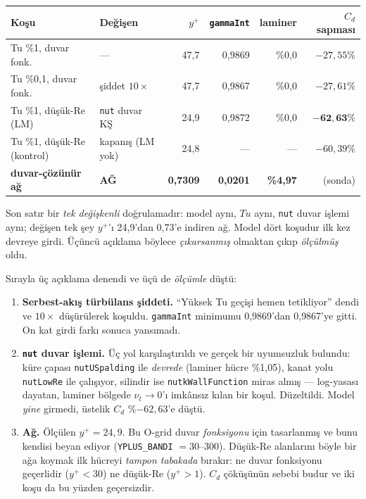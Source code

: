 \documentclass[11pt,a4paper]{article}
\begin{document}
\begin{center}\footnotesize
\begin{tabular}{@{}llrrrr@{}}
\toprule
Koşu & Değişen & $y^+$ & \texttt{gammaInt} & laminer & $C_d$ sapması \\
\midrule
Tu \%1, duvar fonk.        & ---                   & 47{,}7 & 0{,}9869 & \%0{,}0 & $-27{,}55\%$ \\
Tu \%0{,}1, duvar fonk.    & şiddet $10\times$     & 47{,}7 & 0{,}9867 & \%0{,}0 & $-27{,}61\%$ \\
Tu \%1, düşük-Re (LM)      & \texttt{nut} duvar KŞ & 24{,}9 & 0{,}9872 & \%0{,}0 & $\mathbf{-62{,}63\%}$ \\
Tu \%1, düşük-Re (kontrol) & kapanış (LM yok)      & 24{,}8 & ---      & ---     & $-60{,}39\%$ \\
\textbf{duvar-çözünür ağ}  & \textbf{AĞ}           & \textbf{0{,}7309} & \textbf{0{,}0201} & \textbf{\%4{,}97} & (sonda) \\
\bottomrule
\end{tabular}
\end{center}

\noindent Son satır bir \emph{tek değişkenli} doğrulamadır: model aynı,
$Tu$ aynı, \texttt{nut} duvar işlemi aynı; değişen tek şey $y^+$'ı 24{,}9'dan
0{,}73'e indiren ağ. Model dört koşudur ilk kez devreye girdi. Üçüncü açıklama
böylece \emph{çıkarsanmış} olmaktan çıkıp \emph{ölçülmüş} oldu.

\noindent Sırayla üç açıklama denendi ve üçü de \emph{ölçümle} düştü:

\begin{enumerate}\itemsep2pt
\item \textbf{Serbest-akış türbülans şiddeti.} ``Yüksek Tu geçişi hemen
tetikliyor'' dendi ve $10\times$ düşürülerek koşuldu. \texttt{gammaInt}
minimumu 0{,}9869'dan 0{,}9867'ye gitti. On kat girdi farkı sonuca
yansımadı.
\item \textbf{\texttt{nut} duvar işlemi.} Üç yol karşılaştırıldı ve gerçek
bir uyumsuzluk bulundu: küre çapası \texttt{nutUSpalding} ile
\emph{devrede} (laminer hücre \%1{,}05), kanat yolu \texttt{nutLowRe} ile
çalışıyor, silindir ise \texttt{nutkWallFunction} miras almış --- log-yasası
dayatan, laminer bölgede $\nu_t \!\to\! 0$'ı imkânsız kılan bir koşul.
Düzeltildi. Model \emph{yine} girmedi, üstelik $C_d$ \%$-62{,}63$'e düştü.
\item \textbf{Ağ.} Ölçülen $y^+ = 24{,}9$. Bu O-grid duvar
\emph{fonksiyonu} için tasarlanmış ve bunu kendisi beyan ediyor
(\texttt{YPLUS\_BANDI} $=30$--$300$). Düşük-Re alanlarını böyle bir ağa
koymak ilk hücreyi \emph{tampon tabakada} bırakır: ne duvar fonksiyonu
geçerlidir ($y^+\!<\!30$) ne düşük-Re ($y^+\!>\!1$). $C_d$ çöküşünün sebebi
budur ve iki koşu da bu yüzden geçersizdir.
\end{enumerate}
\end{document}
